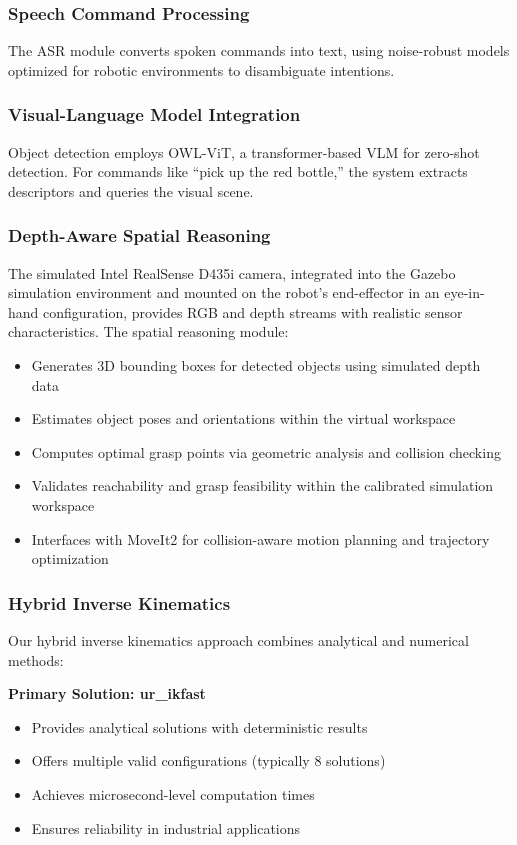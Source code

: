 \documentclass[conference]{IEEEtran}
\begin{document}
\subsubsection{Speech Command Processing}
The ASR module converts spoken commands into text, using noise-robust models optimized for robotic environments to disambiguate intentions.

\subsubsection{Visual-Language Model Integration}
Object detection employs OWL-ViT, a transformer-based VLM for zero-shot detection. For commands like ``pick up the red bottle,'' the system extracts descriptors and queries the visual scene.

\subsubsection{Depth-Aware Spatial Reasoning}
The simulated Intel RealSense D435i camera, integrated into the Gazebo simulation environment and mounted on the robot's end-effector in an eye-in-hand configuration, provides RGB and depth streams with realistic sensor characteristics. The spatial reasoning module:
\begin{itemize}
    \item Generates 3D bounding boxes for detected objects using simulated depth data
    \item Estimates object poses and orientations within the virtual workspace
    \item Computes optimal grasp points via geometric analysis and collision checking
    \item Validates reachability and grasp feasibility within the calibrated simulation workspace
    \item Interfaces with MoveIt2 for collision-aware motion planning and trajectory optimization
\end{itemize}

\subsubsection{Hybrid Inverse Kinematics}
Our hybrid inverse kinematics approach combines analytical and numerical methods:

\textbf{Primary Solution: ur\_ikfast}
\begin{itemize}
    \item Provides analytical solutions with deterministic results
    \item Offers multiple valid configurations (typically 8 solutions)
    \item Achieves microsecond-level computation times
    \item Ensures reliability in industrial applications
\end{itemize}
\end{document}
